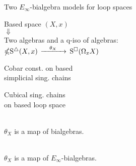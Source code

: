 %
%
%

\begin{frame}[fragile]{Two $E_\infty$-bialgebra models for loop spaces}
	\pause
	\vspace*{-1pt}
	\begin{center}
		Based space $(X,x)$ \\ \pause
		$\Downarrow$ \\
		Two algebras
		and a q-iso of algebras: \\
		\medskip
		$\mathbb{\Omega} \mathrm{S}^{\triangle}(X, x)$
		$\xrightarrow{\quad \theta_X \quad }$
		$\mathrm{S}^{\square}(\Omega_x X)$
	\end{center}

	\begin{minipage}{.45\textwidth}
		\begin{flushright}
			Cobar const. on based \\
			simplicial sing. chains
		\end{flushright}
	\end{minipage}
	\hspace*{.9cm}
	\begin{minipage}{.4\textwidth}
		Cubical sing. chains \\
		on based loop space
	\end{minipage}

	\bigskip\smallskip\pause
	 \\
	$\theta_X$ is a map of bialgebras.

	\bigskip\pause
	 \\
	$\theta_X$ is a map of $E_\infty$-bialgebras.
\end{frame}

